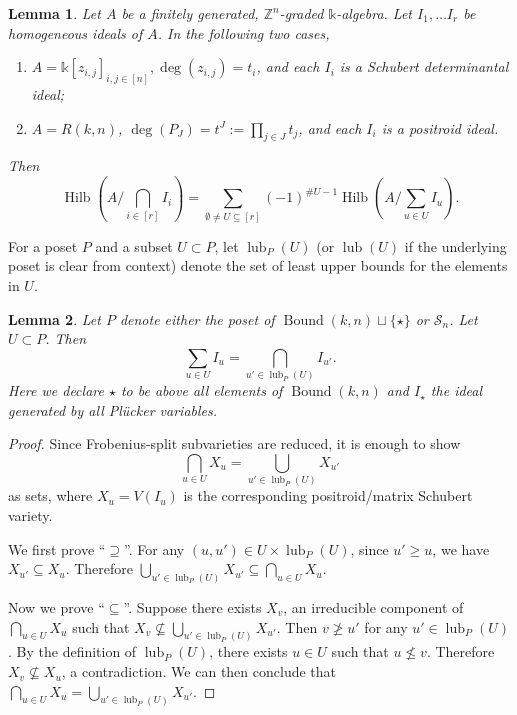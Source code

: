 \documentclass[12pt,reqno]{amsart}
\newtheorem{lemma}{Lemma}[section]
\theoremstyle{definition}
\renewcommand{\k}{\mathbb{k}}
\newcommand{\symm}{\mathcal{S}}
\newcommand{\bound}{\operatorname{Bound}}
\newcommand{\lub}{\operatorname{lub}}
\newcommand{\hilb}{\operatorname{Hilb}}
\begin{document}
{\begin{lemma}\label{lemma:hilbrecur}
Let $A$ be a finitely generated, $\mathbb{Z}^n$-graded $\k$-algebra. Let $I_1,\dots I_r$ be homogeneous ideals of $A$. In the following two cases,
\begin{enumerate}
    \item $A = \k[z_{i,j}]_{i,j\in [n]}, \deg(z_{i,j}) = t_i$, and each $I_i$ is a Schubert determinantal ideal;
    \item $A = R(k,n)$, $\deg(P_J) = t^J := \prod_{j\in J}t_j$, and each $I_i$ is a positroid ideal.
\end{enumerate}
    Then
    \begin{equation}\label{eqn:hilbrecur}
        \hilb(A/\bigcap_{i\in [r]}I_i) = \sum_{\emptyset\neq U\subseteq [r]}(-1)^{\#U-1}\hilb(A/\sum_{u\in U}I_u).
    \end{equation}
\end{lemma}

For a poset $P$ and a subset $U\subset P$, let $\lub_P(U)$ (or $\lub(U)$ if the underlying poset is clear from context) denote the set of least upper bounds for the elements in $U$.

\begin{lemma}
    \label{lem:inttosum}
    Let $P$ denote either the poset of $\bound(k,n)\sqcup\{\star\}$ or $\symm_n$. Let $U\subset P$. Then 
    \begin{equation}
    \label{eqn:sumtoint}
    \sum_{u\in U}I_u=\bigcap_{u'\in \lub_P(U)} I_{u'}.
    \end{equation}
    Here we declare $\star$ to be above all elements of $\bound(k,n)$ and $I_\star$ the ideal generated by all Pl\"ucker variables.
\end{lemma}
\begin{proof}
    Since Frobenius-split subvarieties are reduced, it is enough to show 
    \[\bigcap_{u\in U}X_u = \bigcup_{u'\in \lub_P(U)} X_{u'}\]
    as sets, 
    where $X_u = V(I_u)$ is the corresponding positroid/matrix Schubert variety. 
    
    We first prove ``$\supseteq$''. For any $(u,u')\in U\times \lub_P(U)$, since $u' \geq u$, we have $X_{u'}\subseteq X_u$. Therefore $\bigcup_{u'\in \lub_P(U)} X_{u'} \subseteq \bigcap_{u\in U}X_u$.
    
    Now we prove ``$\subseteq$''. Suppose there exists $X_v$, an irreducible component of $\bigcap_{u\in U}X_u$ such that $X_v\not\subseteq \bigcup_{u'\in \lub_{P}(U)}X_{u'}$. Then
    $v\ngeq u'$ for any $u'\in \lub_P(U)$. By the definition of $\lub_P(U)$, there exists $u\in U$ such that $u\nleq v$. Therefore $X_v\not\subseteq X_u$, a contradiction. We can then conclude that $\bigcap_{u\in U}X_u = \bigcup_{u'\in \lub_P(U)} X_{u'}$. 
\end{proof}


}
\end{document}
